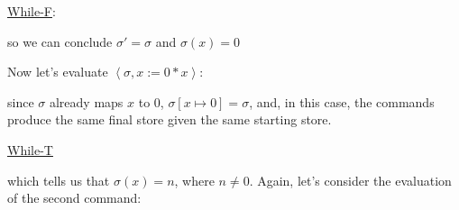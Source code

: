 \documentclass[11pt]{article}
\begin{document}
\begin{exercise}
\begin{enumerate}
\underline{While-F}:

\begin{prooftree}
\end{prooftree}

so we can conclude $\sigma' = \sigma$ and $\sigma(x) = 0$

Now let's evaluate $\left< \sigma, x:= 0 * x\right>$:

\begin{prooftree}
\end{prooftree}

since $\sigma$ already maps $x$ to 0, $\sigma[x \mapsto 0] = \sigma$, and, in this case, the commands produce the same final store given the same starting store.

\underline{While-T}
\footnotesize 
\begin{prooftree}
\end{prooftree}
\normalsize

which tells us that $\sigma(x) = n$, where $n \neq 0$. Again, let's consider the evaluation of the second command:

\begin{prooftree}
\end{prooftree}


\end{enumerate}
\end{exercise}
\end{document}
